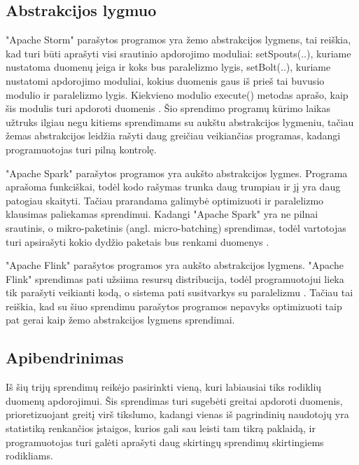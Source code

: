 \documentclass{VUMIFPSkursinis}
\begin{document}
\subsection{Abstrakcijos lygmuo}

"Apache Storm" parašytos programos yra žemo abstrakcijos lygmens, tai reiškia, kad turi būti aprašyti visi srautinio apdorojimo moduliai: 
setSpouts(..), kuriame nustatoma duomenų įeiga ir koks bus paralelizmo lygis, setBolt(..), kuriame nustatomi apdorojimo moduliai,
kokius duomenis gaus iš prieš tai buvusio modulio ir paralelizmo lygis. Kiekvieno modulio execute() metodas aprašo, kaip šis modulis 
turi apdoroti duomenis \cite{tutpoint}. Šio sprendimo programų kūrimo laikas užtruks ilgiau negu kitiems sprendimams su aukštu abstrakcijos lygmeniu,
tačiau žemas abstrakcijos leidžia rašyti daug greičiau veikiančias programas, kadangi programuotojas turi pilną kontrolę.

"Apache Spark" parašytos programos yra aukšto abstrakcijos lygmes. 
Programa aprašoma funkciškai, todėl kodo rašymas trunka daug trumpiau ir jį yra daug patogiau skaityti. Tačiau prarandama galimybė optimizuoti
ir paralelizmo klausimas paliekamas sprendimui. Kadangi "Apache Spark" yra ne pilnai srautinis, o mikro-paketinis (angl. micro-batching) 
sprendimas, todėl vartotojas turi apsirašyti kokio dydžio paketais bus renkami duomenys \cite{shoro2015big}.

"Apache Flink" parašytos programos yra aukšto abstrakcijos lygmens. "Apache Flink" 
sprendimas pati užsiima resursų distribucija, todėl programuotojui lieka tik parašyti veikianti kodą, o sistema pati susitvarkys su paralelizmu \cite{flinkdoc}. Tačiau 
tai reiškia, kad su šiuo sprendimu parašytos programos nepavyks optimizuoti taip pat gerai kaip žemo abstrakcijos lygmens sprendimai.

\subsection{Apibendrinimas}
Iš šių trijų sprendimų reikėjo pasirinkti vieną, kuri labiausiai tiks rodiklių duomenų apdorojimui. Šis sprendimas turi sugebėti greitai apdoroti duomenis,
prioretizuojant greitį virš tikslumo, kadangi vienas iš pagrindinių naudotojų yra statistiką renkančios įstaigos, kurios gali sau leisti tam tikrą paklaidą,
ir programuotojas turi galėti aprašyti daug skirtingų sprendimų skirtingiems rodikliams.\par
\end{document}
